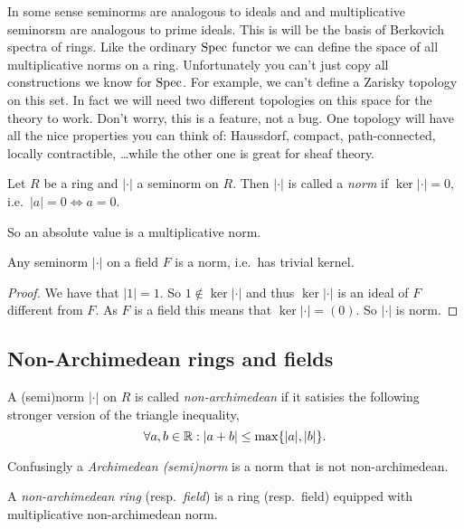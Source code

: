In some sense seminorms are analogous to ideals and and multiplicative seminorsm are analogous to prime ideals. This is will be the basis of Berkovich spectra of rings.
Like the ordinary $\operatorname{Spec}$ functor we can define the space of all multiplicative norms on a ring. 
Unfortunately you can't just copy all constructions we know for $\operatorname{Spec}$. 
For example, we can't define a Zarisky topology on this set. 
In fact we will need two different topologies on this space for the theory to work. 
Don't worry, this is a feature, not a bug. 
One topology will have all the nice properties you can think of: Haussdorf, compact, path-connected, locally contractible, \ldots while the other one is great for sheaf theory. 


\begin{definition}
	Let $R$ be a ring and $|\cdot |$ a seminorm on $R$. 
	Then $|\cdot |$ is called a \emph{norm} if $\ker |\cdot | = 0$, i.e.\ $|a| = 0 \iff a = 0$. 
\end{definition}

So an absolute value is a multiplicative norm. 

\begin{lemma}
	Any seminorm $|\cdot |$ on a field $F$ is a norm, i.e.\ has trivial kernel. 
\end{lemma}
\begin{proof}
	We have that $|1| = 1$. So $1 \not\in \ker |\cdot |$ and thus $\ker |\cdot |$ is an ideal of $F$ different from $F$. 
	As $F$ is a field this means that $\ker |\cdot | = (0)$. So $|\cdot |$ is norm. 
\end{proof}

\subsection{Non-Archimedean rings and fields} \label{sec:non-archimedean_rings_and_fields}
\begin{definition}
	A (semi)norm $|\cdot |$ on $R$ is called \emph{non-archimedean} if it satisies the following stronger version of the triangle inequality, \[
	\forall a, b \in \mathbb{R}: |a + b| \le \max \{|a|, |b|\} 
	.\] 

	Confusingly a \emph{Archimedean (semi)norm} is a norm that is not non-archimedean.
\end{definition}

\begin{definition}
	A \emph{non-archimedean ring} (resp.\ \emph{field}) is a ring (resp.\ field) equipped with multiplicative non-archimedean norm. 
\end{definition}

